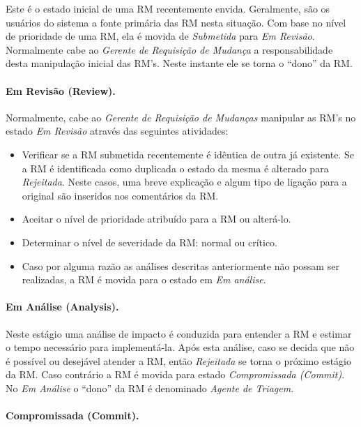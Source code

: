 Este é o estado inicial de uma RM recentemente envida. Geralmente, são os
usuários do sistema a fonte primária das RM nesta situação. Com base no nível de
prioridade de uma RM, ela é movida de \textit{Submetida} para \textit{Em
	Revisão}. Normalmente cabe ao \textit{Gerente de Requisição de Mudança} a
responsabilidade desta manipulação inicial das RM's. Neste instante ele se torna
o ``dono'' da RM.

\paragraph{Em Revisão (Review).}
\label{par:em_revisao}
Normalmente, cabe ao \textit{Gerente de Requisição de Mudanças} manipular as
RM's no estado \textit{Em Revisão} através das seguintes atividades:

\begin{itemize}
	\item Verificar se a RM submetida recentemente é idêntica de outra já
		existente. Se a RM é identificada como duplicada o estado da mesma é
		alterado para \textit{Rejeitada}. Neste casos, uma breve explicação e
		algum tipo de ligação para a original são inseridos nos comentários da
		RM.
	\item Aceitar o nível de prioridade atribuído para a RM ou alterá-lo.
	\item Determinar o nível de severidade da RM: normal ou crítico.
	\item Caso por alguma razão as análises descritas anteriormente não possam
		ser re\-a\-li\-za\-das, a RM é movida para o estado em \textit{Em análise}.
\end{itemize}

\paragraph{Em Análise (Analysis).}
\label{par:em_analise}
Neste estágio uma análise de impacto é conduzida para entender a RM e estimar o
tempo necessário para implementá-la. Após esta análise, caso se decida que não é
possível ou desejável atender a RM, então \textit{Rejeitada} se torna o próximo
estágio da RM. Caso contrário a RM é movida para estado \textit{Compromissada
	(Commit)}. No  \textit{Em Análise} o ``dono'' da RM é denominado
\textit{Agente de Triagem}.

\paragraph{Compromissada (Commit).}
\label{par:commit}

